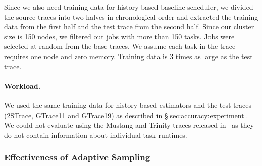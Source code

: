 \fi

Since we also need training data for history-based
baseline scheduler, we divided the source traces into two halves in
chronological order and extracted the training data from the first half and the
test trace from the second half. Since our cluster size is 150 nodes, we
filtered out jobs with more than 150 tasks. Jobs were selected at random from
the base traces. We assume each task in the trace requires one node and zero
memory.  Training data is 3 times as large as the test trace.
\fi

\paragraph{Workload.}
\label{sec:sim:workload}
We used the same training data for history-based estimators and the test
traces (2STrace, GTrace11 and GTrace19)
as described in
\S\ref{sec:accuracy:experiment}.
We could not evaluate \slearn using the Mustang and Trinity traces released
in~\cite{workloadDiversity:atc18} as they do not contain information about
individual task runtimes.

\subsubsection{Effectiveness of Adaptive Sampling}
\label{sec:sim:numPilots}

